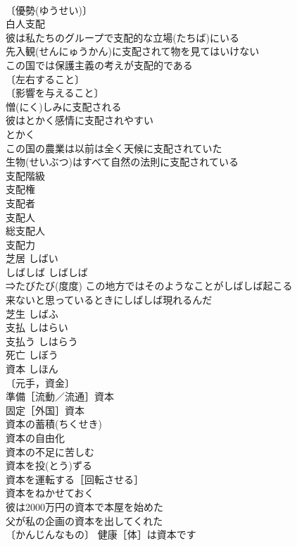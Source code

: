\documentclass[8pt]{extreport}
\begin{document}
\begin{CJK}{UTF8}{min}
\\	〔優勢(ゆうせい)〕
\\	白人支配 
\\	彼は私たちのグループで支配的な立場(たちば)にいる 
\\	先入観(せんにゅうかん)に支配されて物を見てはいけない 
\\	この国では保護主義の考えが支配的である 
\\	〔左右すること〕
\\	〔影響を与えること〕
\\	憎(にく)しみに支配される 
\\	彼はとかく感情に支配されやすい 
\\	とかく 
\\	この国の農業は以前は全く天候に支配されていた 
\\	生物(せいぶつ)はすべて自然の法則に支配されている 
\\	支配階級 
\\	支配権 
\\	支配者 
\\	支配人 
\\	総支配人 
\\	支配力 
\\	芝居	しばい	
\\	しばしば	しばしば	
\\	⇒たびたび(度度) この地方ではそのようなことがしばしば起こる 
\\	来ないと思っているときにしばしば現れるんだ 
\\	芝生	しばふ	
\\	支払	しはらい	
\\	支払う	しはらう	
\\	死亡	しぼう	
\\	資本	しほん	
\\	〔元手，資金〕
\\	準備［流動／流通］資本 
\\	固定［外国］資本 
\\	資本の蓄積(ちくせき) 
\\	資本の自由化 
\\	資本の不足に苦しむ 
\\	資本を投(とう)ずる 
\\	資本を運転する［回転させる］ 
\\	資本をねかせておく 
\\	彼は2000万円の資本で本屋を始めた 
\\	父が私の企画の資本を出してくれた 
\\	〔かんじんなもの〕 健康［体］は資本です 

\end{CJK}
\end{document}
